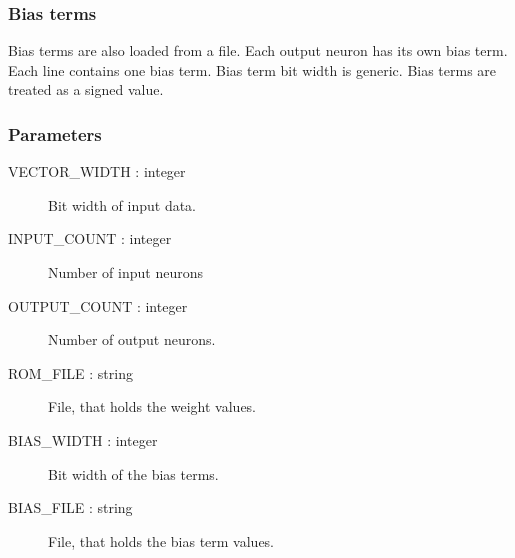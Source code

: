 \subsubsection{Bias terms}

Bias terms are also loaded from a file. Each output neuron has its own bias term. Each line contains one bias term. Bias term bit width is generic. Bias terms are treated as a signed value.
	

\subsubsection{Parameters}
\begin{description}
	\item [VECTOR\_WIDTH   : integer] Bit width of input data.
	\item [INPUT\_COUNT    : integer] Number of input neurons
	\item [OUTPUT\_COUNT   : integer] Number of output neurons.
	\item [ROM\_FILE       : string] File, that holds the weight values.
	\item [BIAS\_WIDTH     : integer] Bit width of the bias terms.
	\item [BIAS\_FILE      : string] File, that holds the bias term values.
\end{description}


